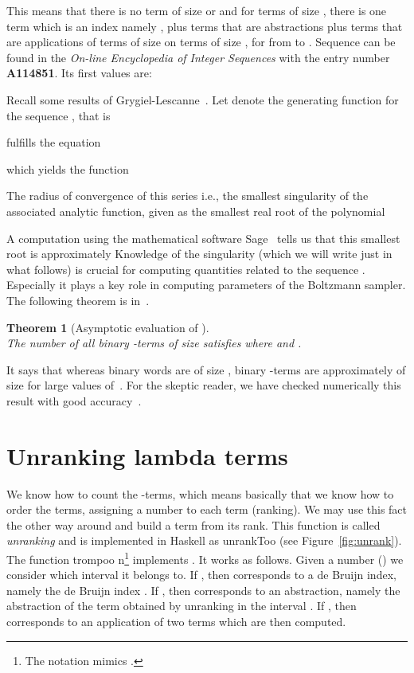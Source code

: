 \documentclass{sig-alternate}
\newtheorem{theorem}{Theorem}
\begin{document}
\begin{figure*}[!t]
This means that there is no term of size  or  and for terms of size ,
there is one term which is an index namely , plus  terms that are
abstractions plus  terms that are
applications of terms of size  on terms of size , for  from  to .
Sequence  can be found in the \emph{On-line Encyclopedia of
  Integer Sequences} with the entry number \textbf{A114851}. Its first  values
are:
\begin{center}
  

  
\end{center}
Recall some results of Grygiel-Lescanne~\cite{DBLP:journals/corr/GrygielL14}.  Let 
denote the generating function for the sequence , that is


 fulfills the equation

which yields \ifICFP the function

\else
 \fi 
The radius of convergence of this series i.e., the
smallest singularity of the associated analytic function, given as the smallest real
root of the polynomial

A computation using the mathematical software
\textsf{Sage}~\cite{sage} tells us that this smallest root is approximately
 Knowledge of the singularity 
(which we will write just  in what follows) is crucial for computing quantities
related to the sequence .  Especially it plays a key role
in computing parameters of the Boltzmann sampler.  The following theorem is
in~\cite{DBLP:journals/corr/GrygielL14}.
\begin{theorem}[Asymptotic evaluation of ]~\\
  The number of all binary \mbox{-terms} of size  satisfies
   where  and .
\end{theorem}
It says that whereas binary words are of size , binary \mbox{-terms} are
approximately of size  for large values of~.  For the skeptic reader, we
have checked numerically this result with good accuracy~\cite{lescanne13}.

\section{Unranking lambda terms}
\label{sec:unrank}

We know how to count the -terms, which means basically that we know how to order
the terms, assigning a number to each term (ranking).  We may use this fact the other
way around and build a  term from its rank.  This function is called
\emph{unranking} and is implemented in \textsf{Haskell} as \<unrankToo\> (see
Figure~\ref{fig:unrank}).  The function \<trompoo n\>\footnote{The notation 
  mimics .} implements .  It works as follows. Given a number
 () we consider which interval it belongs to.  If , then  corresponds to a de Bruijn index, namely the de Bruijn index
. If , then  corresponds to an abstraction, namely the
abstraction of the term obtained by unranking  in the interval
.  If , then  corresponds to
an application of two terms which are then computed.



\end{figure*}
\end{document}
